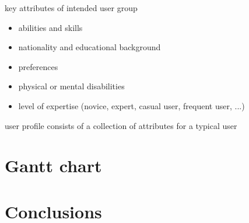 \documentclass[11pt,a4paper]{article}
\begin{document}
key attributes of intended user group
\begin{itemize}
\item abilities and skills
\item nationality and educational background
\item preferences
\item physical or mental disabilities
\item level of expertise (novice, expert, casual user, frequent user, ...)

\end{itemize}

user profile consists of a collection of attributes for a typical user


\section{Gantt chart}

\section{Conclusions}
\end{document}

